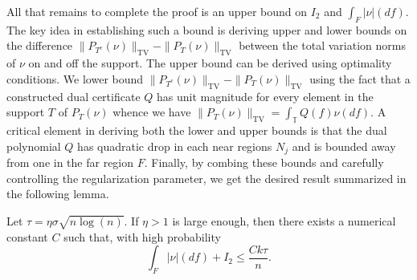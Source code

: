 All that remains to complete the proof is an upper bound on $I_2$ and $\int_F{|\nu|(df)}$.  The key idea in establishing such a bound is deriving upper and lower bounds on the
difference $\| P_{T^c} ( \nu) \|_{{\mathrm{TV}}} - \| P_T ( \nu) \|_{{\mathrm{TV}}}$
between the total variation norms of $\nu$ on and off the support. The upper bound can be derived using optimality conditions. We lower bound $\| P_{T^c} ( \nu)
\|_{{\mathrm{TV}}} - \| P_{T} ( \nu) \|_{{\mathrm{TV}}}$ using the fact that a constructed dual
certificate $Q$ has unit magnitude for every element in the support
$T$ of $P_T ( \nu)$ whence we have $\| P_T ( \nu) \|_{{\mathrm{TV}}} = \int_{\mathbb{T}}
Q ( f) \nu ( d f)$. A critical element in deriving both the lower and upper bounds is that the dual polynomial $Q$ has quadratic drop in each near regions $N_j$ and is bounded away from one in the far region $F$. Finally, by combing these bounds and carefully controlling the regularization parameter, we get the desired result summarized in the following lemma. 
\begin{lemma}
Let $\tau = \eta\sigma \sqrt{n\log(n)}$. If $\eta>1$ is large enough, then there exists a numerical constant $C$ such that, with high probability
\label{part3}
\[
\int_F{|\nu|(df)} + I_2 \leq \frac{C k \tau}{n}.
\]
\end{lemma}
